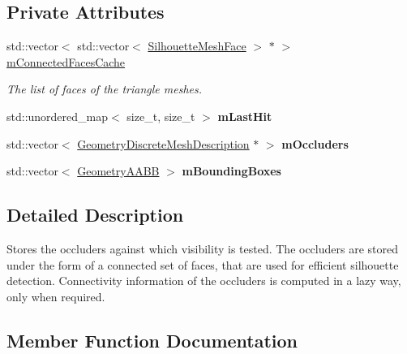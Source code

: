 \subsection*{Private Attributes}
\begin{DoxyCompactItemize}
\item 
std\+::vector$<$ std\+::vector$<$ \mbox{\hyperlink{classvisilib_1_1_silhouette_mesh_face}{Silhouette\+Mesh\+Face}} $>$ $\ast$ $>$ \mbox{\hyperlink{classvisilib_1_1_geometry_occluder_set_a96611893ad5c36867c415cf68cd320c4}{m\+Connected\+Faces\+Cache}}
\begin{DoxyCompactList}\small\item\em The list of faces of the triangle meshes. \end{DoxyCompactList}\item 
\mbox{\label{classvisilib_1_1_geometry_occluder_set_aac4816a11b1e4edc9193696c906ab206}} 
std\+::unordered\+\_\+map$<$ size\+\_\+t, size\+\_\+t $>$ {\bfseries m\+Last\+Hit}
\item 
\mbox{\label{classvisilib_1_1_geometry_occluder_set_a8a0513277e3c682c8fd5dae577d3dcd2}} 
std\+::vector$<$ \mbox{\hyperlink{structvisilib_1_1_geometry_discrete_mesh_description}{Geometry\+Discrete\+Mesh\+Description}} $\ast$ $>$ {\bfseries m\+Occluders}
\item 
\mbox{\label{classvisilib_1_1_geometry_occluder_set_a61e7f53997ce8a65ed8bda96773ec406}} 
std\+::vector$<$ \mbox{\hyperlink{classvisilib_1_1_geometry_a_a_b_b}{Geometry\+A\+A\+BB}} $>$ {\bfseries m\+Bounding\+Boxes}
\end{DoxyCompactItemize}


\subsection{Detailed Description}
Stores the occluders against which visibility is tested. The occluders are stored under the form of a connected set of faces, that are used for efficient silhouette detection. Connectivity information of the occluders is computed in a lazy way, only when required. 

\subsection{Member Function Documentation}
\mbox{\label{classvisilib_1_1_geometry_occluder_set_af27ea9d9989db7c759054b8024317d58}} 
